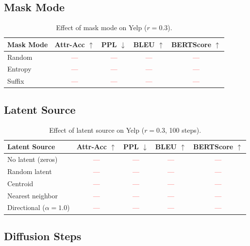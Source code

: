 \documentclass{article}
\newcommand{\tbd}[1]{\textcolor{red}{#1}}  %
\begin{document}
\subsection{Mask Mode}

\begin{table}[h]
\centering
\caption{Effect of mask mode on Yelp ($r=0.3$).}
\label{tab:ablation_mask_mode}
\small
\begin{tabular}{lcccc}
\toprule
\textbf{Mask Mode} & \textbf{Attr-Acc} $\uparrow$ & \textbf{PPL} $\downarrow$ & \textbf{BLEU} $\uparrow$ & \textbf{BERTScore} $\uparrow$ \\
\midrule
Random & \tbd{---} & \tbd{---} & \tbd{---} & \tbd{---} \\
Entropy & \tbd{---} & \tbd{---} & \tbd{---} & \tbd{---} \\
Suffix & \tbd{---} & \tbd{---} & \tbd{---} & \tbd{---} \\
\bottomrule
\end{tabular}
\end{table}

\subsection{Latent Source}

\begin{table}[h]
\centering
\caption{Effect of latent source on Yelp ($r=0.3$, 100 steps).}
\label{tab:ablation_latent_source}
\small
\begin{tabular}{lcccc}
\toprule
\textbf{Latent Source} & \textbf{Attr-Acc} $\uparrow$ & \textbf{PPL} $\downarrow$ & \textbf{BLEU} $\uparrow$ & \textbf{BERTScore} $\uparrow$ \\
\midrule
No latent (zeros) & \tbd{---} & \tbd{---} & \tbd{---} & \tbd{---} \\
Random latent & \tbd{---} & \tbd{---} & \tbd{---} & \tbd{---} \\
Centroid & \tbd{---} & \tbd{---} & \tbd{---} & \tbd{---} \\
Nearest neighbor & \tbd{---} & \tbd{---} & \tbd{---} & \tbd{---} \\
Directional ($\alpha=1.0$) & \tbd{---} & \tbd{---} & \tbd{---} & \tbd{---} \\
\bottomrule
\end{tabular}
\end{table}

\subsection{Diffusion Steps}
\end{document}
